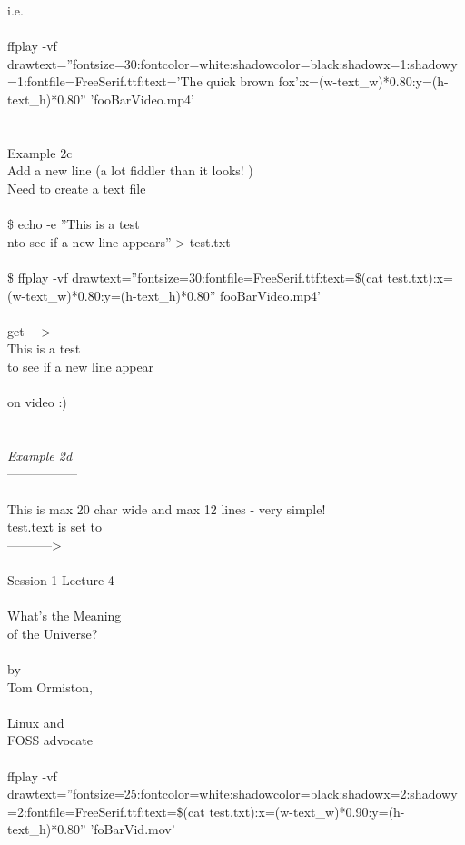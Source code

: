 \documentclass[10pt,a4paper]{article}
\begin{document}
{{{{{{{{{{{{{{i.e.\\
\\
}{\large ffplay -vf drawtext=''fontsize=30:fontcolor=white:shadowcolor=black:shadowx=1:shadowy=1:fontfile=FreeSerif.ttf:text='The quick brown fox':x=(w-text\_w)*0.80:y=(h-text\_h)*0.80'' 'fooBarVideo.mp4'}{\Large \\
\\
\\
Example 2c\\
Add a new line (a lot fiddler than it looks! )\\
Need to create a text file\\
\\
\$ echo -e ''This is a test\\nto see if a new line appears'' > test.txt\\
\\
\$ ffplay -vf drawtext=''fontsize=30:fontfile=FreeSerif.ttf:text=\$(cat test.txt):x=(w-text\_w)*0.80:y=(h-text\_h)*0.80'' fooBarVideo.mp4'\\
\\
get --->\\
		This is a test\\
		to see if a new line appear\\
\\
on video :)\\
\\
\\
\textit{Example 2d}}{\Large \\
-----------------\\
\\
This is max 20 char wide and max 12 lines - very simple!\\
test.text  is set to\\
----------->\\
\\
}			Session 1 Lecture 4\\
\\
			What's the Meaning \\
			of the Universe?\\
\\
			by\\
			Tom Ormiston,\\
\\
			Linux and \\
			FOSS advocate{\Large \\
\\
ffplay -vf drawtext=''fontsize=25:fontcolor=white:shadowcolor=black:shadowx=2:shadowy=2:fontfile=FreeSerif.ttf:text=\$(cat test.txt):x=(w-text\_w)*0.90:y=(h-text\_h)*0.80'' 'foBarVid.mov'\\
}}}}}}}}}}}}}}
\end{document}
